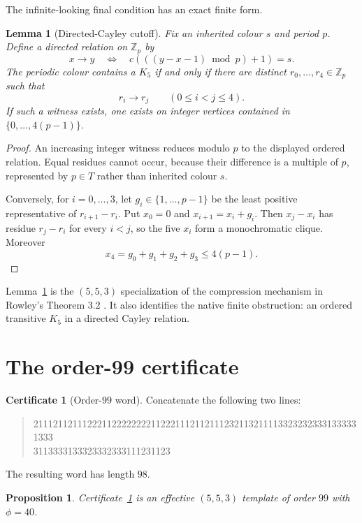 \documentclass[11pt]{article}
\newtheorem{proposition}[theorem]{Proposition}
\newtheorem{lemma}[theorem]{Lemma}
\theoremstyle{definition}
\newtheorem{certificate}[theorem]{Certificate}
\theoremstyle{remark}
\newcommand{\Z}{\mathbb Z}
\begin{document}
The infinite-looking final condition has an exact finite form.

\begin{lemma}[Directed-Cayley cutoff]
\label{lem:cutoff}
Fix an inherited colour $s$ and period $p$. Define a directed relation on
$\Z_p$ by
\[
  x\longrightarrow y
  \quad\Longleftrightarrow\quad
  c\!\left(((y-x-1)\bmod p)+1\right)=s.
\]
The periodic colour contains a $K_5$ if and only if there are distinct
$r_0,\ldots,r_4\in\Z_p$ such that
\[
  r_i\longrightarrow r_j\qquad(0\le i<j\le4).
\]
If such a witness exists, one exists on integer vertices contained in
$\{0,\ldots,4(p-1)\}$.
\end{lemma}

\begin{proof}
An increasing integer witness reduces modulo $p$ to the displayed ordered
relation. Equal residues cannot occur, because their difference is a
multiple of $p$, represented by $p\in T$ rather than inherited colour $s$.

Conversely, for $i=0,\ldots,3$, let $g_i\in\{1,\ldots,p-1\}$ be the least
positive representative of $r_{i+1}-r_i$. Put $x_0=0$ and
$x_{i+1}=x_i+g_i$. Then $x_j-x_i$ has residue $r_j-r_i$ for every
$i<j$, so the five $x_i$ form a monochromatic clique. Moreover
\[
  x_4=g_0+g_1+g_2+g_3\le4(p-1).
\]
\end{proof}

Lemma~\ref{lem:cutoff} is the $(5,5,3)$ specialization of the compression
mechanism in Rowley's Theorem 3.2 \cite{rowley-general}. It also identifies
the native finite obstruction: an ordered transitive $K_5$ in a directed
Cayley relation.

\section{The order-99 certificate}

\begin{certificate}[Order-$99$ word]
\label{cert:order99}
Concatenate the following two lines:
\begin{quote}
\ttfamily\footnotesize
2111211211122211222222221122211121121112321132111133232323331333331333\\
3113333133323332333111231123
\end{quote}
The resulting word has length $98$.
\end{certificate}

\begin{proposition}
\label{prop:order99}
Certificate~\ref{cert:order99} is an effective $(5,5,3)$ template of order
$99$ with $\phi=40$.
\end{proposition}
\end{document}
